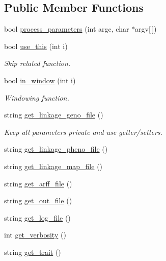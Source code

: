 \subsection*{Public Member Functions}
\begin{DoxyCompactItemize}
\item 
bool \hyperlink{classParamReader_aeccf4ded55394619359a2c85bc163b57}{process\_\-parameters} (int argc, char $\ast$argv\mbox{[}$\,$\mbox{]})
\item 
bool \hyperlink{classParamReader_a3b1cf53fc0ed5ffd32744852f7c0015d}{use\_\-this} (int i)
\begin{DoxyCompactList}\small\item\em Skip related function. \item\end{DoxyCompactList}\item 
bool \hyperlink{classParamReader_ab3a203d5c9698bf8ed1bcd7b7d77a263}{in\_\-window} (int i)
\begin{DoxyCompactList}\small\item\em Windowing function. \item\end{DoxyCompactList}\item 
string \hyperlink{classParamReader_a3fbb431f095c3eec170925a2e694c906}{get\_\-linkage\_\-geno\_\-file} ()
\begin{DoxyCompactList}\small\item\em Keep all parameters private and use getter/setters. \item\end{DoxyCompactList}\item 
string \hyperlink{classParamReader_a10a774de006ca94c081a960e60067673}{get\_\-linkage\_\-pheno\_\-file} ()
\item 
string \hyperlink{classParamReader_a0ad3f8e7cecb2a30b68894da7ae60986}{get\_\-linkage\_\-map\_\-file} ()
\item 
string \hyperlink{classParamReader_a1db0df02a87cf08451a306fe64687dda}{get\_\-arff\_\-file} ()
\item 
string \hyperlink{classParamReader_a37437fb7b8c52a7b0d820aa12368adfd}{get\_\-out\_\-file} ()
\item 
string \hyperlink{classParamReader_ae45f59e58362073c2f957feb11267a75}{get\_\-log\_\-file} ()
\item 
int \hyperlink{classParamReader_a61dd4ab6c8ad46531fb55c138f59c296}{get\_\-verbosity} ()
\item 
string \hyperlink{classParamReader_ab630108daee4ef506b82e6ecc61f0852}{get\_\-trait} ()

\end{DoxyCompactItemize}
